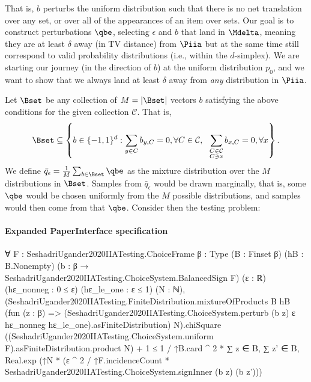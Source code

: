 \documentclass[10pt]{article}
\begin{document}
\begin{ReviewVerbatim}
	That is, $b$ perturbs the uniform distribution such that there is no net translation over any set, or over all of the appearances of an item over sets. Our goal is to construct perturbations $\qbe$, selecting $\epsilon$ and $b$ that land in $\Mdelta$, meaning they are at least $\delta$ away (in TV distance) from $\Piia$ but at the same time still correspond to valid probability distributions (i.e., within the $d$-simplex). We are starting our journey (in the direction of $b$) at the uniform distribution $p_0$, and we want to show that we always land at least $\delta$ away from {\it any} distribution in $\Piia$.

	Let $\Bset$ be any collection of $M=|\Bset|$ vectors $b$ satisfying the above conditions for the given collection $\mathcal C$. That is,
	\begin{align}
	\label{eq:bset_full}
	\Bset \subseteq
	\left \{
	b \in \lbrace -1, 1 \rbrace^d
	:
	\sum_{y \in C} b_{y,C} = 0, \forall C \in \mathcal C,
	\ \
	\sum_{\substack{C \in \mathcal{C}\\ C \ni x}} b_{x,C} = 0, \forall x
	\right \}.
	\end{align}
	We define $\bar{q}_\epsilon = \frac{1}{M} \sum_{b \in \Bset} \qbe$ as the mixture distribution over the $M$ distributions in $\Bset$. Samples from $\bar{q}_\epsilon$ would be drawn marginally, that is, some $\qbe$ would be chosen uniformly from the $M$ possible distributions, and samples would then come from that $\qbe$. Consider then the testing problem:
\end{ReviewVerbatim}



\paragraph{Expanded PaperInterface specification}
\begin{ReviewVerbatim}
∀ {F : SeshadriUgander2020IIATesting.ChoiceFrame} {β : Type} (B : Finset β) (hB : B.Nonempty)
  (b : β → SeshadriUgander2020IIATesting.ChoiceSystem.BalancedSign F) (ε : ℝ) (hε_nonneg : 0 ≤ ε) (hε_le_one : ε ≤ 1)
  (N : ℕ),
  (SeshadriUgander2020IIATesting.FiniteDistribution.mixtureOfProducts B hB
            (fun (z : β) =>
              (SeshadriUgander2020IIATesting.ChoiceSystem.perturb (b z) ε hε_nonneg hε_le_one).asFiniteDistribution)
            N).chiSquare
        ((SeshadriUgander2020IIATesting.ChoiceSystem.uniform F).asFiniteDistribution.product N) +
      1 ≤
    1 / ↑B.card ^ 2 *
      ∑ z ∈ B,
        ∑ z' ∈ B,
          Real.exp
            (↑N * (ε ^ 2 / ↑F.incidenceCount * SeshadriUgander2020IIATesting.ChoiceSystem.signInner (b z) (b z')))
\end{ReviewVerbatim}
\end{document}
